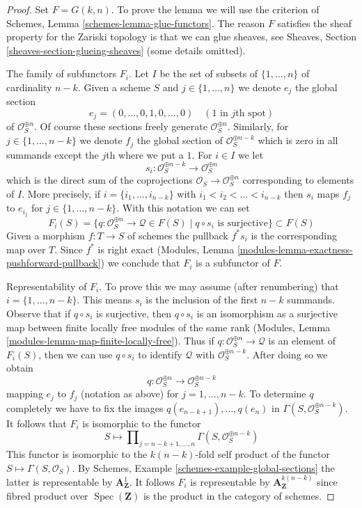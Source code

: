 \documentclass{stacks-project}
\theoremstyle{plain}
\theoremstyle{definition}
\theoremstyle{remark}
\numberwithin{equation}{subsection}
\def\Spec{\mathop{\mathrm{Spec}}}
\begin{document}
\begin{proof}
Set $F = G(k, n)$. To prove the lemma we will use the criterion of
Schemes, Lemma \ref{schemes-lemma-glue-functors}.
The reason $F$ satisfies the sheaf property for the
Zariski topology is that we can glue sheaves, see Sheaves,
Section \ref{sheaves-section-glueing-sheaves} (some details omitted).

\medskip\noindent
The family of subfunctors $F_i$.
Let $I$ be the set of subsets of $\{1, \ldots, n\}$ of cardinality $n - k$.
Given a scheme $S$ and $j \in \{1, \ldots, n\}$ we denote $e_j$
the global section
$$
e_j = (0, \ldots, 0, 1, 0, \ldots, 0)\quad(1\text{ in }j\text{th spot})
$$
of $\mathcal{O}_S^{\oplus n}$. Of course these sections freely generate
$\mathcal{O}_S^{\oplus n}$. Similarly, for $j \in \{1, \ldots, n - k\}$
we denote $f_j$ the global section of $\mathcal{O}_S^{\oplus n - k}$
which is zero in all summands except the $j$th where we put a $1$.
For $i \in I$ we let
$$
s_i : \mathcal{O}_S^{\oplus n - k} \longrightarrow \mathcal{O}_S^{\oplus n}
$$
which is the direct sum of the coprojections
$\mathcal{O}_S \to \mathcal{O}_S^{\oplus n}$ corresponding to elements of $I$.
More precisely, if $i = \{i_1, \ldots, i_{n - k}\}$ with
$i_1 < i_2 < \ldots < i_{n - k}$
then $s_i$ maps $f_j$ to $e_{i_j}$ for $j \in \{1, \ldots, n - k\}$.
With this notation we can set
$$
F_i(S) = \{q : \mathcal{O}_S^{\oplus n} \to \mathcal{Q} \in F(S) \mid
q \circ s_i \text{ is surjective}\}
\subset F(S)
$$
Given a morphism $f : T \to S$ of schemes the pullback $f^*s_i$
is the corresponding map over $T$. Since $f^*$ is right exact
(Modules, Lemma \ref{modules-lemma-exactness-pushforward-pullback})
we conclude that $F_i$ is a subfunctor of $F$.

\medskip\noindent
Representability of $F_i$. To prove this we may assume (after renumbering)
that $i = \{1, \ldots, n - k\}$. This means $s_i$ is the inclusion of
the first $n - k$ summands. Observe that if $q \circ s_i$ is surjective,
then $q \circ s_i$ is an isomorphism as a surjective map between finite
locally free modules of the same rank
(Modules, Lemma \ref{modules-lemma-map-finite-locally-free}).
Thus if $q : \mathcal{O}_S^{\oplus n} \to \mathcal{Q}$ is an element of
$F_i(S)$, then we can use $q \circ s_i$ to identify $\mathcal{Q}$ with
$\mathcal{O}_S^{\oplus n - k}$. After doing so we obtain
$$
q : \mathcal{O}_S^{\oplus n} \longrightarrow \mathcal{O}_S^{\oplus n - k}
$$
mapping $e_j$ to $f_j$ (notation as above) for $j = 1, \ldots, n - k$.
To determine $q$ completely we have to fix the images
$q(e_{n - k + 1}), \ldots, q(e_n)$ in
$\Gamma(S, \mathcal{O}_S^{\oplus n - k})$.
It follows that $F_i$ is isomorphic to the functor
$$
S \longmapsto
\prod\nolimits_{j = n - k + 1, \ldots, n}
\Gamma(S,  \mathcal{O}_S^{\oplus n - k})
$$
This functor is isomorphic to the $k(n - k)$-fold self product of the functor
$S \mapsto \Gamma(S, \mathcal{O}_S)$. By
Schemes, Example \ref{schemes-example-global-sections}
the latter is representable by $\mathbf{A}^1_\mathbf{Z}$. It follows $F_i$
is representable by $\mathbf{A}^{k(n - k)}_\mathbf{Z}$ since fibred product
over $\Spec(\mathbf{Z})$ is the product in the category of schemes.


\end{proof}
\end{document}
